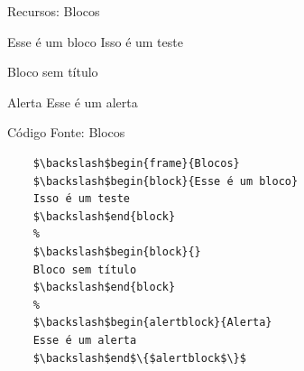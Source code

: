 \begin{frame}{Recursos: Blocos}
    \begin{block}{Esse é um bloco}
        Isso é um teste
    \end{block}
    \begin{block}{}
        Bloco sem título	
    \end{block}
    \begin{alertblock}{Alerta}
        Esse é um alerta
    \end{alertblock}
\end{frame}
\begin{frame}[fragile]{Código Fonte: Blocos}
    \begin{lstlisting}
    $\backslash$begin{frame}{Blocos}
    $\backslash$begin{block}{Esse é um bloco}
    Isso é um teste
    $\backslash$end{block}
    %
    $\backslash$begin{block}{}
    Bloco sem título	
    $\backslash$end{block}
    %
    $\backslash$begin{alertblock}{Alerta}
    Esse é um alerta
    $\backslash$end$\{$alertblock$\}$
    \end{lstlisting}
\end{frame}

